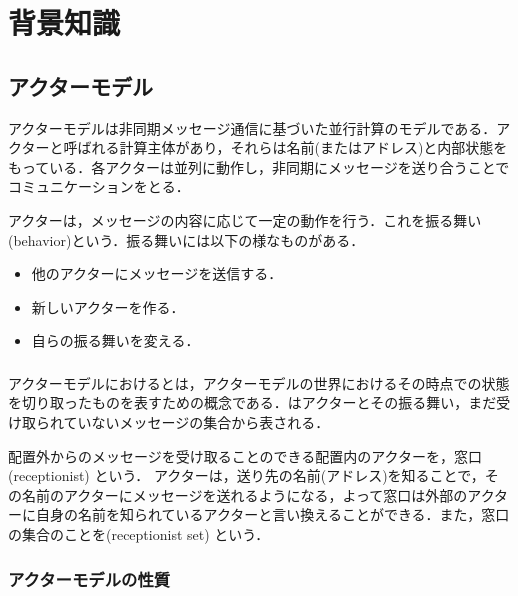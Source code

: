 \section{背景知識}


\subsection{アクターモデル}

アクターモデルは非同期メッセージ通信に基づいた並行計算のモデルである\cite[actor]{actor}．アクターと呼ばれる計算主体があり，それらは名前(またはアドレス)と内部状態をもっている．各アクターは並列に動作し，非同期にメッセージを送り合うことでコミュニケーションをとる．

アクターは，メッセージの内容に応じて一定の動作を行う．これを振る舞い(behavior)という．振る舞いには以下の様なものがある．

\begin{itemize}
  \item 他のアクターにメッセージを送信する．
  \item 新しいアクターを作る．
  \item 自らの振る舞いを変える．
\end{itemize}

\subsubsection{\conf}

アクターモデルにおける\conf とは，アクターモデルの世界におけるその時点での状態を切り取ったものを表すための概念である．\conf はアクターとその振る舞い，まだ受け取られていないメッセージの集合から表される．

配置外からのメッセージを受け取ることのできる配置内のアクターを，窓口 (receptionist) という．
アクターは，送り先の名前(アドレス)を知ることで，その名前のアクターにメッセージを送れるようになる，よって窓口は外部のアクターに自身の名前を知られているアクターと言い換えることができる．また，窓口の集合のことを\recep (receptionist set) という．


\subsubsection{アクターモデルの性質}

